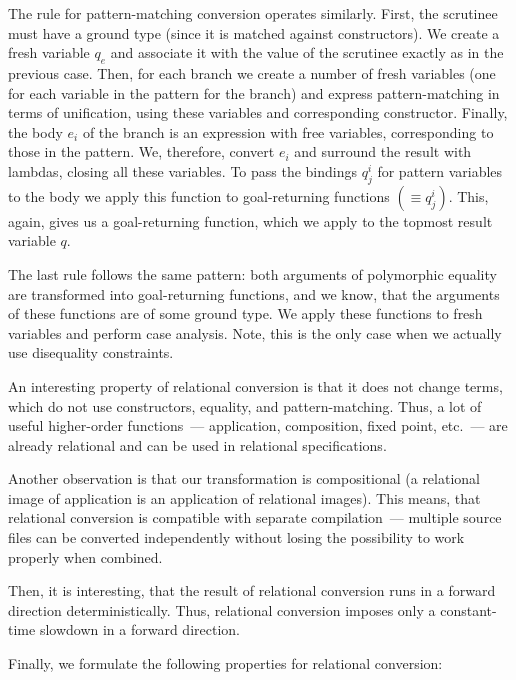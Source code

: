 The rule for pattern-matching conversion operates similarly. First, the scrutinee must have a ground type (since it is matched against
constructors). We create a fresh variable $q_e$ and associate it with the value of the scrutinee exactly as in the previous
case. Then, for each branch we create a number of fresh variables (one for each variable in the pattern for the branch) and
express pattern-matching in terms of unification, using these variables and corresponding constructor. Finally, the body $e_i$ of the branch
is an expression with free variables, corresponding to those in the pattern. We, therefore, convert $e_i$ and surround the result with
lambdas, closing all these variables. To pass the bindings $q^i_j$ for pattern variables to the body we apply this function to
 goal-returning functions $(\equiv q^i_j)$. This, again, gives us a goal-returning function, which we apply to the topmost result variable $q$.

The last rule follows the same pattern: both arguments of polymorphic equality are transformed into goal-returning functions, and we know, that
the arguments of these functions are of some ground type. We apply these functions to fresh variables and perform case analysis. Note, this is
the only case when we actually use disequality constraints.

An interesting property of relational conversion is that it does not change terms, which do not use constructors, equality, and pattern-matching. Thus,
a lot of useful higher-order functions~--- application, composition, fixed point, etc.~--- are already relational and can be used in
relational specifications.

Another observation is that our transformation is compositional (a relational image of application is an application of relational
images). This means, that relational conversion is compatible with separate compilation~--- multiple source files can be
converted independently without losing the possibility to work properly when combined.

Then, it is interesting, that the result of relational conversion runs in a forward direction
deterministically. Thus, relational conversion imposes only a constant-time slowdown in a forward
direction.

Finally, we formulate the following properties for relational conversion:

